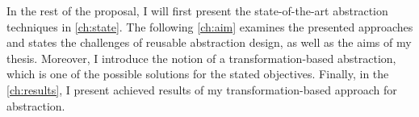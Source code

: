 In the rest of the proposal, I will first present the state-of-the-art
abstraction techniques in \autoref{ch:state}.  The following \autoref{ch:aim}
examines the presented approaches and states the challenges of reusable
abstraction design, as well as the aims of my thesis. Moreover, I
introduce the notion of a transformation-based abstraction, which is one of the
possible solutions for the stated objectives. Finally, in the
\autoref{ch:results}, I present achieved results of my transformation-based
approach for abstraction.
